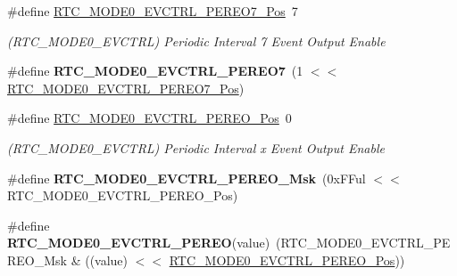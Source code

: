 \begin{DoxyCompactItemize}
\item 
\hypertarget{group___s_a_m_l21___r_t_c_gaa93d34c536ee15a1bae8abbecee5762f}{}\#define \hyperlink{group___s_a_m_l21___r_t_c_gaa93d34c536ee15a1bae8abbecee5762f}{R\+T\+C\+\_\+\+M\+O\+D\+E0\+\_\+\+E\+V\+C\+T\+R\+L\+\_\+\+P\+E\+R\+E\+O7\+\_\+\+Pos}~7\label{group___s_a_m_l21___r_t_c_gaa93d34c536ee15a1bae8abbecee5762f}

\begin{DoxyCompactList}\small\item\em (R\+T\+C\+\_\+\+M\+O\+D\+E0\+\_\+\+E\+V\+C\+T\+R\+L) Periodic Interval 7 Event Output Enable \end{DoxyCompactList}\item 
\hypertarget{group___s_a_m_l21___r_t_c_ga518855160c4a1acd8ac460fc12a2ce07}{}\#define {\bfseries R\+T\+C\+\_\+\+M\+O\+D\+E0\+\_\+\+E\+V\+C\+T\+R\+L\+\_\+\+P\+E\+R\+E\+O7}~(1 $<$$<$ \hyperlink{group___s_a_m_l21___r_t_c_gaa93d34c536ee15a1bae8abbecee5762f}{R\+T\+C\+\_\+\+M\+O\+D\+E0\+\_\+\+E\+V\+C\+T\+R\+L\+\_\+\+P\+E\+R\+E\+O7\+\_\+\+Pos})\label{group___s_a_m_l21___r_t_c_ga518855160c4a1acd8ac460fc12a2ce07}

\item 
\hypertarget{group___s_a_m_l21___r_t_c_ga05f3c3243d77a02067b6d2f7d0501a37}{}\#define \hyperlink{group___s_a_m_l21___r_t_c_ga05f3c3243d77a02067b6d2f7d0501a37}{R\+T\+C\+\_\+\+M\+O\+D\+E0\+\_\+\+E\+V\+C\+T\+R\+L\+\_\+\+P\+E\+R\+E\+O\+\_\+\+Pos}~0\label{group___s_a_m_l21___r_t_c_ga05f3c3243d77a02067b6d2f7d0501a37}

\begin{DoxyCompactList}\small\item\em (R\+T\+C\+\_\+\+M\+O\+D\+E0\+\_\+\+E\+V\+C\+T\+R\+L) Periodic Interval x Event Output Enable \end{DoxyCompactList}\item 
\hypertarget{group___s_a_m_l21___r_t_c_gaed45b9ecae22f296394c7686c41c59f3}{}\#define {\bfseries R\+T\+C\+\_\+\+M\+O\+D\+E0\+\_\+\+E\+V\+C\+T\+R\+L\+\_\+\+P\+E\+R\+E\+O\+\_\+\+Msk}~(0x\+F\+Ful $<$$<$ R\+T\+C\+\_\+\+M\+O\+D\+E0\+\_\+\+E\+V\+C\+T\+R\+L\+\_\+\+P\+E\+R\+E\+O\+\_\+\+Pos)\label{group___s_a_m_l21___r_t_c_gaed45b9ecae22f296394c7686c41c59f3}

\item 
\hypertarget{group___s_a_m_l21___r_t_c_ga656ef7e388cacfc014162204257ccb35}{}\#define {\bfseries R\+T\+C\+\_\+\+M\+O\+D\+E0\+\_\+\+E\+V\+C\+T\+R\+L\+\_\+\+P\+E\+R\+E\+O}(value)~(R\+T\+C\+\_\+\+M\+O\+D\+E0\+\_\+\+E\+V\+C\+T\+R\+L\+\_\+\+P\+E\+R\+E\+O\+\_\+\+Msk \& ((value) $<$$<$ \hyperlink{group___s_a_m_l21___r_t_c_ga05f3c3243d77a02067b6d2f7d0501a37}{R\+T\+C\+\_\+\+M\+O\+D\+E0\+\_\+\+E\+V\+C\+T\+R\+L\+\_\+\+P\+E\+R\+E\+O\+\_\+\+Pos}))\label{group___s_a_m_l21___r_t_c_ga656ef7e388cacfc014162204257ccb35}


\end{DoxyCompactItemize}
